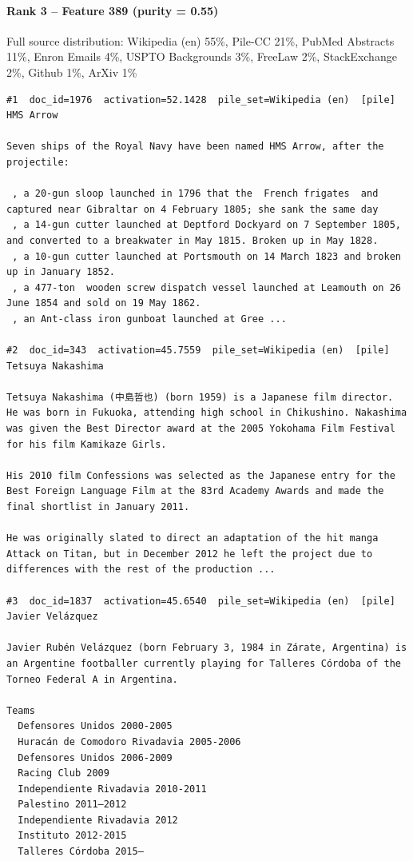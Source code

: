 \paragraph*{Rank 3 -- Feature 389 (purity = 0.55)}

Full source distribution: Wikipedia (en) 55\%, Pile-CC 21\%, PubMed Abstracts 11\%, Enron Emails 4\%, USPTO Backgrounds 3\%, FreeLaw 2\%, StackExchange 2\%, Github 1\%, ArXiv 1\%

\begin{verbatim}
#1  doc_id=1976  activation=52.1428  pile_set=Wikipedia (en)  [pile]
HMS Arrow

Seven ships of the Royal Navy have been named HMS Arrow, after the projectile:

 , a 20-gun sloop launched in 1796 that the  French frigates  and  captured near Gibraltar on 4 February 1805; she sank the same day
 , a 14-gun cutter launched at Deptford Dockyard on 7 September 1805, and converted to a breakwater in May 1815. Broken up in May 1828.
 , a 10-gun cutter launched at Portsmouth on 14 March 1823 and broken up in January 1852.
 , a 477-ton  wooden screw dispatch vessel launched at Leamouth on 26 June 1854 and sold on 19 May 1862.
 , an Ant-class iron gunboat launched at Gree ...

#2  doc_id=343  activation=45.7559  pile_set=Wikipedia (en)  [pile]
Tetsuya Nakashima

Tetsuya Nakashima (中島哲也) (born 1959) is a Japanese film director. He was born in Fukuoka, attending high school in Chikushino. Nakashima was given the Best Director award at the 2005 Yokohama Film Festival for his film Kamikaze Girls.

His 2010 film Confessions was selected as the Japanese entry for the Best Foreign Language Film at the 83rd Academy Awards and made the final shortlist in January 2011.

He was originally slated to direct an adaptation of the hit manga Attack on Titan, but in December 2012 he left the project due to differences with the rest of the production ...

#3  doc_id=1837  activation=45.6540  pile_set=Wikipedia (en)  [pile]
Javier Velázquez

Javier Rubén Velázquez (born February 3, 1984 in Zárate, Argentina) is an Argentine footballer currently playing for Talleres Córdoba of the Torneo Federal A in Argentina.

Teams
  Defensores Unidos 2000-2005
  Huracán de Comodoro Rivadavia 2005-2006
  Defensores Unidos 2006-2009
  Racing Club 2009
  Independiente Rivadavia 2010-2011
  Palestino 2011–2012
  Independiente Rivadavia 2012
  Instituto 2012-2015
  Talleres Córdoba 2015–


\end{verbatim}
